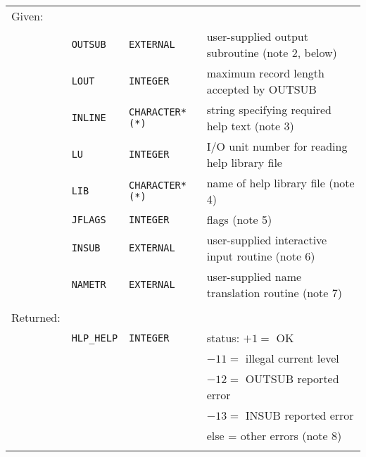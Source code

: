 \begin{tabular}{llll}
\\
Given: \\
& {\tt OUTSUB} & {\tt EXTERNAL} &
                   user-supplied output subroutine (note 2, below) \\
& {\tt LOUT} & {\tt INTEGER} &
                          maximum record length accepted by OUTSUB \\
& {\tt INLINE} & {\tt CHARACTER*(*)} &
                     string specifying required help text (note 3) \\
& {\tt LU} & {\tt INTEGER} &
                     I/O unit number for reading help library file \\
& {\tt LIB} & {\tt CHARACTER*(*)} &
                                name of help library file (note 4) \\
& {\tt JFLAGS} & {\tt INTEGER} &
                                                    flags (note 5) \\
& {\tt INSUB} & {\tt EXTERNAL} &
                  user-supplied interactive input routine (note 6) \\
& {\tt NAMETR} & {\tt EXTERNAL} &
                   user-supplied name translation routine (note 7) \\ \\
Returned: \\
& {\tt HLP\_HELP} & {\tt INTEGER} &
                              status:  $+1=$ OK \\
& & & \hspace{2.6em}               $-11=$ illegal current level \\
& & & \hspace{2.6em}               $-12=$ OUTSUB reported error \\
& & & \hspace{2.6em}               $-13=$ INSUB reported error \\
& & & \hspace{2.75em}             else = other errors (note 8) \\ \\
\end{tabular}


